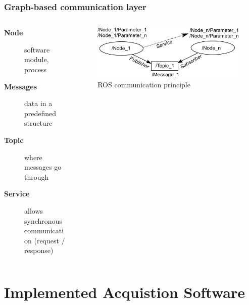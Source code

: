 \documentclass[aspectratio=169]{beamer}
\begin{document}
  \begin{frame}
   \frametitle{Graph-based communication layer}
   \begin{columns}[onlytextwidth]
    \begin{column}{0.5\textwidth}
    
      \begin{description}
       \item [\textbf{Node}] software module, process
       \item [\textbf{Messages}] data in a predefined structure
       \item [\textbf{Topic}] where messages go through
       \item [\textbf{Service}] allows synchronous communication (request / response)
      \end{description}
       
    \end{column}
    \begin{column}{0.5\textwidth}

      \begin{figure}[h]
	\centering
	\includegraphics[width=\textwidth]{./Abbildungen/ROS-Graph-basic.png}
	\caption{ROS communication principle}
	\label{abb:graph}
      \end{figure}
    \end{column}
   \end{columns}
  \end{frame}

\section{Implemented Acquistion Software}
\end{document}

